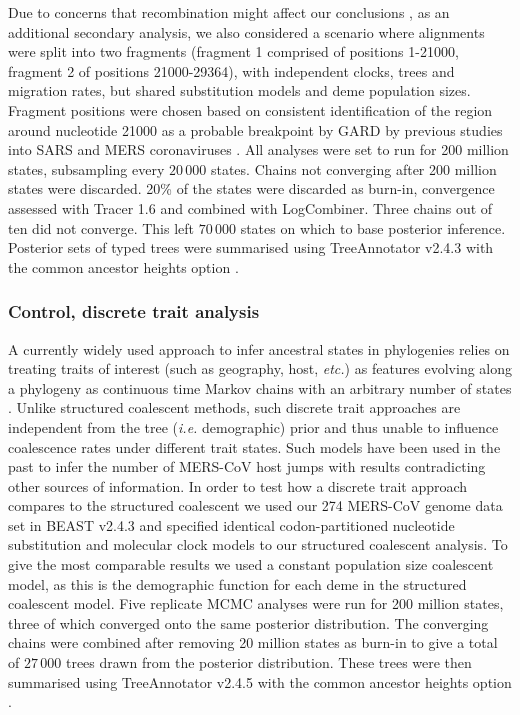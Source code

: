 \documentclass[9pt,lineno]{elife}
\begin{document}
Due to concerns that recombination might affect our conclusions \citep{dudas_mers-cov_2016}, as an additional secondary analysis, we also considered a scenario where alignments were split into two fragments (fragment 1 comprised of positions 1-21000, fragment 2 of positions 21000-29364), with independent clocks, trees and migration rates, but shared substitution models and deme population sizes.
Fragment positions were chosen based on consistent identification of the region around nucleotide 21000 as a probable breakpoint by GARD \citep{pond_gard:_2006} by previous studies into SARS and MERS coronaviruses \citep{hon_evidence_2008,dudas_mers-cov_2016}.
All analyses were set to run for 200 million states, subsampling every $20\,000$ states.
Chains not converging after 200 million states were discarded.
20\% of the states were discarded as burn-in, convergence assessed with Tracer 1.6 and combined with LogCombiner.
Three chains out of ten did not converge.
This left $70\,000$ states on which to base posterior inference.
Posterior sets of typed trees were summarised using TreeAnnotator v2.4.3 with the common ancestor heights option \citep{heled_looking_2013}.

\subsubsection*{Control, discrete trait analysis}

A currently widely used approach to infer ancestral states in phylogenies relies on treating traits of interest (such as geography, host, \textit{etc.}) as features evolving along a phylogeny as continuous time Markov chains with an arbitrary number of states \citep{lemey_bayesian_2009}.
Unlike structured coalescent methods, such discrete trait approaches are independent from the tree (\textit{i.e.} demographic) prior and thus unable to influence coalescence rates under different trait states.
Such models have been used in the past to infer the number of MERS-CoV host jumps \citep{zhang_evolutionary_2016} with results contradicting other sources of information.
In order to test how a discrete trait approach compares to the structured coalescent we used our 274 MERS-CoV genome data set in BEAST v2.4.3 \citep{bouckaert_beast_2014} and specified identical codon-partitioned nucleotide substitution and molecular clock models to our structured coalescent analysis.
To give the most comparable results we used a constant population size coalescent model, as this is the demographic function for each deme in the structured coalescent model.
Five replicate MCMC analyses were run for 200 million states, three of which converged onto the same posterior distribution.
The converging chains were combined after removing 20 million states as burn-in to give a total of $27\,000$ trees drawn from the posterior distribution.
These trees were then summarised using TreeAnnotator v2.4.5 with the common ancestor heights option \citep{heled_looking_2013}.
\end{document}
